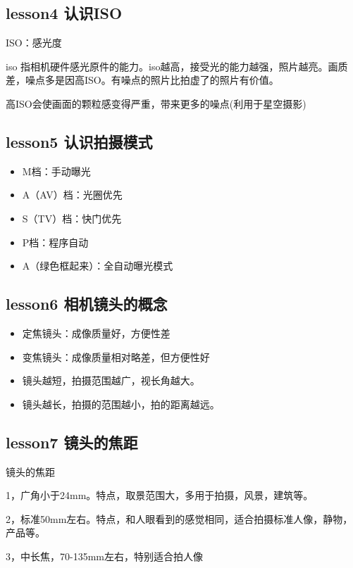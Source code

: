 \documentclass{book}
\begin{document}
\subsection{lesson4 认识ISO}
ISO：感光度

iso 指相机硬件感光原件的能力。iso越高，接受光的能力越强，照片越亮。画质差，噪点多是因高ISO。有噪点的照片比拍虚了的照片有价值。

高ISO会使画面的颗粒感变得严重，带来更多的噪点(利用于星空摄影)
\subsection{lesson5 认识拍摄模式}

\begin{itemize}
  \item M档：手动曝光
  \item A（AV）档：光圈优先
  \item S（TV）档：快门优先
  \item P档：程序自动
  \item A（绿色框起来）：全自动曝光模式
\end{itemize}
\subsection{lesson6 相机镜头的概念}

\begin{itemize}
  \item 定焦镜头：成像质量好，方便性差
  \item 变焦镜头：成像质量相对略差，但方便性好
\end{itemize}

\begin{itemize}
  \item 镜头越短，拍摄范围越广，视长角越大。
  \item 镜头越长，拍摄的范围越小，拍的距离越远。
\end{itemize}

\subsection{lesson7 镜头的焦距}

镜头的焦距

1，广角小于24mm。特点，取景范围大，多用于拍摄，风景，建筑等。

2，标准50mm左右。特点，和人眼看到的感觉相同，适合拍摄标准人像，静物，产品等。

3，中长焦，70-135mm左右，特别适合拍人像
\end{document}
